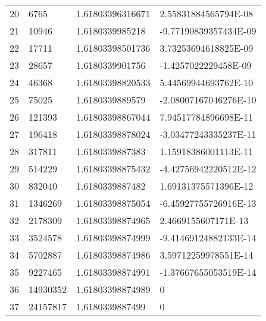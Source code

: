 \documentclass[a4paper]{book}
\begin{document}
\begin{longtable}{llll}
20	&	6765	&	1.61803396316671	&	2.55831884565794E-08	\\
21	&	10946	&	1.6180339985218	&	-9.77190839357434E-09	\\
22	&	17711	&	1.61803398501736	&	3.73253694618825E-09	\\
23	&	28657	&	1.6180339901756	&	-1.4257022229458E-09	\\
24	&	46368	&	1.61803398820533	&	5.44569944693762E-10	\\
25	&	75025	&	1.6180339889579	&	-2.08007167046276E-10	\\
26	&	121393	&	1.61803398867044	&	7.94517784896698E-11	\\
27	&	196418	&	1.61803398878024	&	-3.03477243335237E-11	\\
28	&	317811	&	1.6180339887383	&	1.15918386001113E-11	\\
29	&	514229	&	1.61803398875432	&	-4.42756942220512E-12	\\
30	&	832040	&	1.6180339887482	&	1.69131375571396E-12	\\
31	&	1346269	&	1.61803398875054	&	-6.45927755726916E-13	\\
32	&	2178309	&	1.61803398874965	&	2.4669155607171E-13	\\
33	&	3524578	&	1.61803398874999	&	-9.41469124882133E-14	\\
34	&	5702887	&	1.61803398874986	&	3.59712259978551E-14	\\
35	&	9227465	&	1.61803398874991	&	-1.37667655053519E-14	\\
36	&	14930352	&	1.61803398874989	&	0	\\
37	&	24157817	&	1.6180339887499	&	0	\\
\end{longtable}
\end{document}
